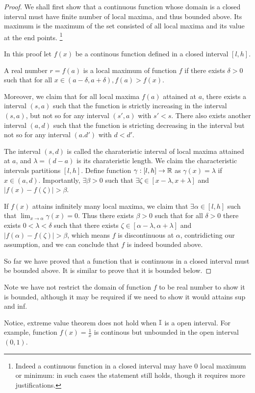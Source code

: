 \documentclass[../note.tex]{subfiles}
\begin{document}
\begin{proof}
	We shall first show that a continuous function whose domain is a closed interval must have finite number of local maxima, and thus bounded above. Its maximum is the maximum of the set consisted of all local maxima and its value at the end points. 
	\footnote{
		Indeed a continuous function in a closed interval may have 0 local maximum or minimum: in such cases the statement still holds, though it requires more justifications.
	}

	In this proof let $f(x)$ be a continous function defined in a closed interval $[l, h]$.

	A real number $r = f(a)$ is a local maximum of function $f$ if there exists $\delta > 0$ such that for all $x \in(a-\delta, a+\delta), f(a)>f(x)$. 

	Moreover, we claim that for all local maxima $f(a)$ attained at $a$, there exists a interval $(s, a)$  such that the function is strictly increasing in the interval $(s,a)$, but not so for any interval $(s', a)$ with $s'<s$. 
	There also exists another interval $(a, d)$ such that the function is stricting decreasing in the interval but not so for any interval $(a. d')$ with $d<d'$.

	The interval $(s,d)$ is called the charateristic interval of local maxima attained at $a$, and $\lambda = (d-a)$ is its charateristic length. 
	We claim the characteristic intervals partitions $[l,h]$.
	Define function $\gamma: [l,h] \rightarrow \mathbb{R}$ as $\gamma(x) = \lambda$ if $x\in (a,d)$. Importantly, $\exists \beta > 0$ such that $\exists \zeta \in [x-\lambda,x+\lambda]$ and $|f(x)-f(\zeta)|>\beta$.
	
	If $f(x)$ attains infinitely many local maxima, we claim that $\exists \alpha \in [l, h]$ such that $\displaystyle \lim_{x\to \alpha} \gamma (x) = 0$.
	Thus there exists $\beta > 0$ such that for all $\delta>0$ there exists $0<\lambda<\delta$ such that there exists $\zeta \in [\alpha-\lambda, \alpha+\lambda]$ and $|f(\alpha)-f(\zeta)|>\beta$, which means $f$ is discontinuous at $\alpha$, contridicting our assumption, and we can conclude that $f$ is indeed bounded above.

	So far we have proved that a function that is continuous in a closed interval must be bounded above. It is similar to prove that it is bounded below.
\end{proof}
\begin{remark}
	Note we have not restrict the domain of function $f$ to be real number to show it is bounded, although it may be required if we need to show it would attains sup and inf.

	Notice, extreme value theorem does not hold when $\mathbb{I}$ is a open interval. For example, function $f(x)=\frac{1}{x}$ is continous but unbounded in the open interval $(0,1)$.
\end{remark}
\end{document}
